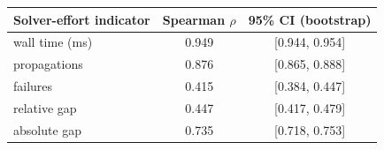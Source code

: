 \begin{tabular}{l c c}
\toprule
Solver-effort indicator & Spearman $\rho$ & 95\% CI (bootstrap)\\
\midrule
wall time (ms) & 0.949 & [0.944, 0.954]\\
propagations & 0.876 & [0.865, 0.888]\\
failures & 0.415 & [0.384, 0.447]\\
relative gap & 0.447 & [0.417, 0.479]\\
absolute gap & 0.735 & [0.718, 0.753]\\
\bottomrule
\end{tabular}

